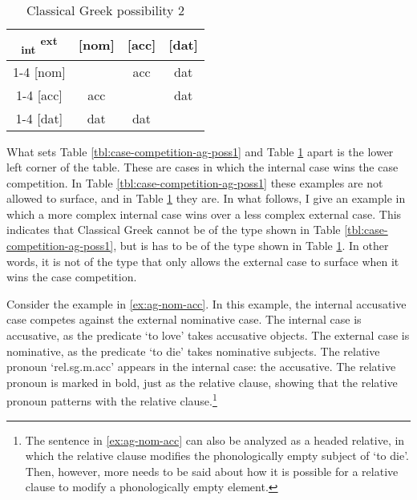 \begin{table}[H]
  \center
  \caption{Classical Greek possibility 2}
  \begin{tabular}{c|c|c|c}
    \toprule
    \textsubscript{\ac{int}} \textsuperscript{\ac{ext}}
           & [\ac{nom}]
           & [\ac{acc}]
           & [\ac{dat}]
           \\ \cmidrule{1-4}
       [\ac{nom}]
           & \xcancel{\phantom{xx}}
           & \ac{acc}
           & \ac{dat}
           \\ \cmidrule{1-4}
       [\ac{acc}]
           & \ac{acc}
           & \xcancel{\phantom{xx}}
           & \cellcolor{LG}\ac{dat}
           \\ \cmidrule{1-4}
       [\ac{dat}]
           & \ac{dat}
           & \ac{dat}
           & \xcancel{\phantom{xx}}
           \\
     \bottomrule
  \end{tabular}
    \label{tbl:case-competition-ag-poss2}
\end{table}

What sets Table \ref{tbl:case-competition-ag-poss1} and Table \ref{tbl:case-competition-ag-poss2} apart is the lower left corner of the table. These are cases in which the internal case wins the case competition.
In Table \ref{tbl:case-competition-ag-poss1} these examples are not allowed to surface, and in Table \ref{tbl:case-competition-ag-poss2} they are.
In what follows, I give an example in which a more complex internal case wins over a less complex external case. This indicates that Classical Greek cannot be of the type shown in Table \ref{tbl:case-competition-ag-poss1}, but is has to be of the type shown in Table \ref{tbl:case-competition-ag-poss2}. In other words, it is not of the type that only allows the external case to surface when it wins the case competition.

Consider the example in \ref{ex:ag-nom-acc}. In this example, the internal accusative case competes against the external nominative case.
The internal case is accusative, as the predicate  `to love' takes accusative objects.
The external case is nominative, as the predicate  `to die' takes nominative subjects.
The relative pronoun  `\ac{rel}.\ac{sg}.\ac{m}.\ac{acc}' appears in the internal case: the accusative. The relative pronoun is marked in bold, just as the relative clause, showing that the relative pronoun patterns with the relative clause.\footnote{
The sentence in \ref{ex:ag-nom-acc} can also be analyzed as a headed relative, in which the relative clause modifies the phonologically empty subject of  `to die'. Then, however, more needs to be said about how it is possible for a relative clause to modify a phonologically empty element.
}

